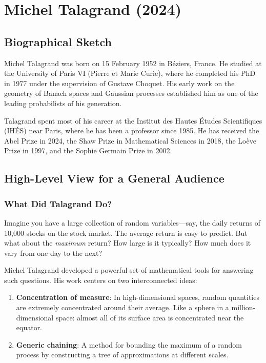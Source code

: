 \chapter{Michel Talagrand (2024)}

\section{Biographical Sketch}



Michel Talagrand was born on 15 February 1952 in B\'eziers, France. He studied at the University of Paris VI (Pierre et Marie Curie), where he completed his PhD in 1977 under the supervision of Gustave Choquet. His early work on the geometry of Banach spaces and Gaussian processes established him as one of the leading probabilists of his generation.

Talagrand spent most of his career at the Institut des Hautes \'Etudes Scientifiques (IH\'ES) near Paris, where he has been a professor since 1985. He has received the Abel Prize in 2024, the Shaw Prize in Mathematical Sciences in 2018, the Lo\`eve Prize in 1997, and the Sophie Germain Prize in 2002.

\section{High-Level View for a General Audience}

\subsection{What Did Talagrand Do?}

Imagine you have a large collection of random variables---say, the daily returns of 10,000 stocks on the stock market. The average return is easy to predict. But what about the \emph{maximum} return? How large is it typically? How much does it vary from one day to the next?

Michel Talagrand developed a powerful set of mathematical tools for answering such questions. His work centers on two interconnected ideas:

\begin{enumerate}
\item \textbf{Concentration of measure}: In high-dimensional spaces, random quantities are extremely concentrated around their average. Like a sphere in a million-dimensional space: almost all of its surface area is concentrated near the equator.

\item \textbf{Generic chaining}: A method for bounding the maximum of a random process by constructing a tree of approximations at different scales.
\end{enumerate}

